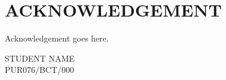 \chapter*{ACKNOWLEDGEMENT}

Acknowledgement goes here.







\vspace{1cm}
STUDENT NAME\\
PUR076/BCT/000


